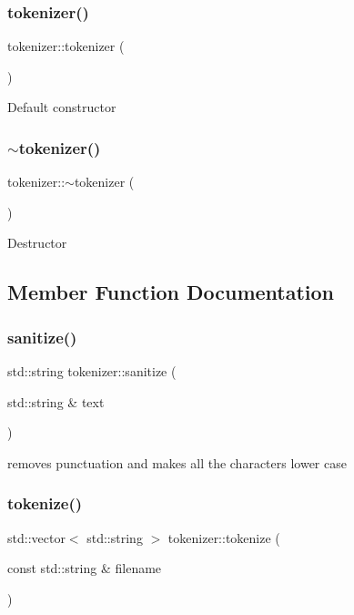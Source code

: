 \subsubsection{\texorpdfstring{tokenizer()}{tokenizer()}}
{\footnotesize\ttfamily tokenizer\+::tokenizer (\begin{DoxyParamCaption}{ }\end{DoxyParamCaption})}

Default constructor \mbox{\label{classtokenizer_a458162a13637fc34d706f8743ffa8909}} 
\subsubsection{\texorpdfstring{$\sim$tokenizer()}{~tokenizer()}}
{\footnotesize\ttfamily tokenizer\+::$\sim$tokenizer (\begin{DoxyParamCaption}{ }\end{DoxyParamCaption})}

Destructor 

\subsection{Member Function Documentation}
\mbox{\label{classtokenizer_a5d553b843e67154be958b849fbf20b62}} 
\subsubsection{\texorpdfstring{sanitize()}{sanitize()}}
{\footnotesize\ttfamily std\+::string tokenizer\+::sanitize (\begin{DoxyParamCaption}\item[{std\+::string \&}]{text }\end{DoxyParamCaption})\hspace{0.3cm}{\ttfamily [static]}}

removes punctuation and makes all the characters lower case \mbox{\label{classtokenizer_aa1a768f007e710ff25d63a2cb1de83c3}} 
\subsubsection{\texorpdfstring{tokenize()}{tokenize()}}
{\footnotesize\ttfamily std\+::vector$<$ std\+::string $>$ tokenizer\+::tokenize (\begin{DoxyParamCaption}\item[{const std\+::string \&}]{filename }\end{DoxyParamCaption})\hspace{0.3cm}{\ttfamily [static]}}

